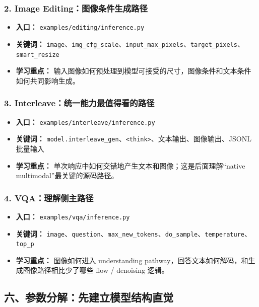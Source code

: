 \subsubsection*{2. Image Editing：图像条件生成路径}

\begin{itemize}[leftmargin=1.5em]
  \item \textbf{入口：} \texttt{examples/editing/inference.py}
  \item \textbf{关键词：} \texttt{image}、\texttt{img\_cfg\_scale}、\texttt{input\_max\_pixels}、\texttt{target\_pixels}、\texttt{smart\_resize}
  \item \textbf{学习重点：} 输入图像如何预处理到模型可接受的尺寸，图像条件和文本条件如何共同影响生成。
\end{itemize}

\subsubsection*{3. Interleave：统一能力最值得看的路径}

\begin{itemize}[leftmargin=1.5em]
  \item \textbf{入口：} \texttt{examples/interleave/inference.py}
  \item \textbf{关键词：} \texttt{model.interleave\_gen}、\texttt{<think>}、文本输出、图像输出、JSONL 批量输入
  \item \textbf{学习重点：} 单次响应中如何交错地产生文本和图像；这是后面理解“native multimodal”最关键的源码路径。
\end{itemize}

\subsubsection*{4. VQA：理解侧主路径}

\begin{itemize}[leftmargin=1.5em]
  \item \textbf{入口：} \texttt{examples/vqa/inference.py}
  \item \textbf{关键词：} \texttt{image}、\texttt{question}、\texttt{max\_new\_tokens}、\texttt{do\_sample}、\texttt{temperature}、\texttt{top\_p}
  \item \textbf{学习重点：} 图像如何进入 understanding pathway，回答文本如何解码，和生成图像路径相比少了哪些 flow / denoising 逻辑。
\end{itemize}

\subsection{六、参数分解：先建立模型结构直觉}

